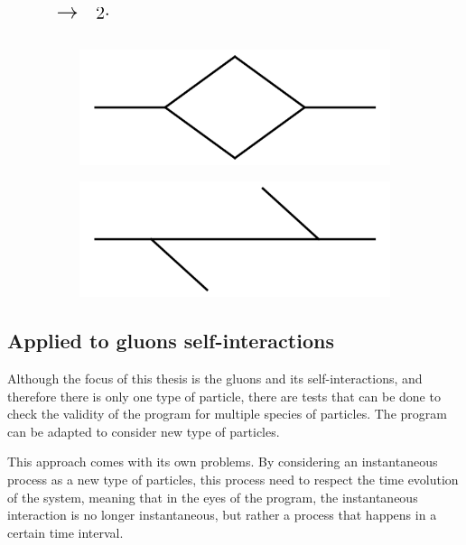 \documentclass[11pt,a4paper,twoside,pdf]{article}
\numberwithin{equation}{section}
\begin{document}
\begin{figure}[h!]
\begin{subfigure}[t]{.1\textwidth}
    \end{subfigure}%
    $\displaystyle \quad %
    \raisebox{1.8\height}{\LARGE $\to$} $
    $\displaystyle \quad %
    \raisebox{1.2\height}{\Large $2\cdot$} $
    \begin{subfigure}[t]{.2\textwidth}
    \includegraphics[width=\textwidth]{plots/1to1_1.png}
    \end{subfigure}%
    \raisebox{1.3\height}{\Large $+$}\quad
    \raisebox{1.2\height}{\Large $2\cdot$}
    \begin{subfigure}[t]{.2\textwidth}
    \includegraphics[width=\textwidth]{plots/1to1_2.png}
    \end{subfigure}%
\end{figure}





\subsection{Applied to gluons self-interactions} \label{sec:applied_gluons}
Although the focus of this thesis is the gluons and its self-interactions, 
and therefore there is only one type of particle, there are tests that can be done to 
check the validity of the program for multiple species of particles.
The program can be adapted to consider new type of particles.

This approach comes with its own problems. By considering an instantaneous 
process as a new type of particles, this process need to respect the time 
evolution of the system, meaning that in the eyes of the program, the 
instantaneous interaction is no longer instantaneous, but rather a process that
happens in a certain time interval. 
\end{document}
